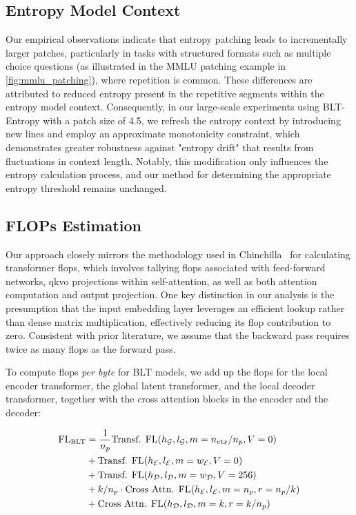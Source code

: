 \subsection{Entropy Model Context}
\label{section:entropy-context}
Our empirical observations indicate that entropy patching leads to incrementally larger patches, particularly in tasks with structured formats such as multiple choice questions (as illustrated in the MMLU patching example in \autoref{fig:mmlu_patching}), where repetition is common. These differences are attributed to reduced entropy present in the repetitive segments within the entropy model context. Consequently, in our large-scale experiments using {\textsc BLT}-Entropy with a patch size of 4.5, we refresh the entropy context by introducing new lines and employ an approximate monotonicity constraint, which demonstrates greater robustness against "entropy drift" that results from fluctuations in context length. Notably, this modification only influences the entropy calculation process, and our method for determining the appropriate entropy threshold remains unchanged.

\subsection{FLOPs Estimation} 
\label{section:flops}

Our approach closely mirrors the methodology used in Chinchilla~\citep{hoffmann2022training} for calculating transformer flops, which involves tallying flops associated with feed-forward networks, qkvo projections within self-attention, as well as both attention computation and output projection. One key distinction in our analysis is the presumption that the input embedding layer leverages an efficient lookup rather than dense matrix multiplication, effectively reducing its flop contribution to zero. Consistent with prior literature, we assume that the backward pass requires twice as many flops as the forward pass.

To compute flops \textit{per byte} for {\textsc BLT} models, we add up the flops for the local encoder transformer, the global latent transformer, and the local decoder transformer, together with the cross attention blocks in the encoder and the decoder:

\begin{align}
    \text{FL}_{\text{{\textsc BLT}}} &= \frac{1}{n_p} \text{Transf. FL}(h_{\mathcal{G}}, l_{\mathcal{G}}, m=n_{ctx}/n_p,V=0)\\
   &+ \text{Transf. FL}(h_{\mathcal{E}}, l_{\mathcal{E}}, m=w_{\mathcal{E}}, V=0) \\
   &+ \text{Transf. FL}(h_{\mathcal{D}}, l_{\mathcal{D}}, m=w_{\mathcal{D}}, V=256) \\ 
    &+ k/n_p \cdot \text{Cross Attn. FL}(h_{\mathcal{E}}, l_{\mathcal{E}}, m=n_p, r=n_p/k) \\ 
   &+ \text{Cross Attn. FL}(h_{\mathcal{D}}, l_{\mathcal{D}}, m=k, r=k/n_p)
\end{align}


